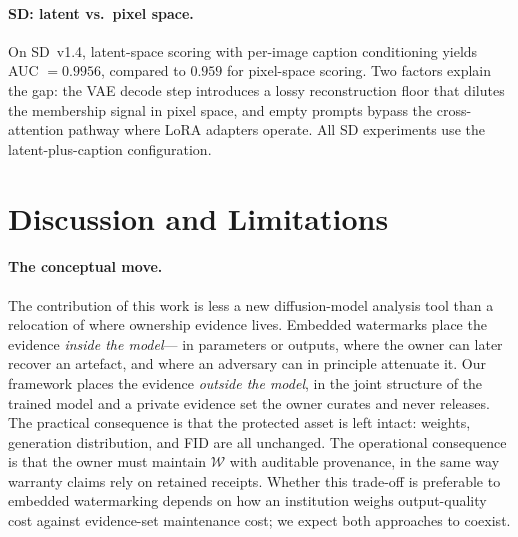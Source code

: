 \documentclass{article}
\begin{document}
\paragraph{SD: latent vs.\ pixel space.}
On SD~v1.4, latent-space scoring with per-image caption 
conditioning yields AUC $= 0.9956$, compared to $0.959$ for 
pixel-space scoring. Two factors explain the gap: the VAE decode 
step introduces a lossy reconstruction floor that dilutes the 
membership signal in pixel space, and empty prompts bypass the 
cross-attention pathway where LoRA adapters operate. All SD 
experiments use the latent-plus-caption configuration.
\section{Discussion and Limitations}
\label{sec:discussion}

\paragraph{The conceptual move.}
The contribution of this work is less a new diffusion-model
analysis tool than a relocation of where ownership evidence lives.
Embedded watermarks place the evidence \emph{inside the model}---
in parameters or outputs, where the owner can later recover an
artefact, and where an adversary can in principle attenuate it.
Our framework places the evidence \emph{outside the model}, in
the joint structure of the trained model and a private evidence
set the owner curates and never releases. The practical
consequence is that the protected asset is left intact: weights,
generation distribution, and FID are all unchanged. The
operational consequence is that the owner must maintain
$\mathcal{W}$ with auditable provenance, in the same way warranty
claims rely on retained receipts. Whether this trade-off is
preferable to embedded watermarking depends on how an institution
weighs output-quality cost against evidence-set maintenance cost;
we expect both approaches to coexist.
\end{document}
